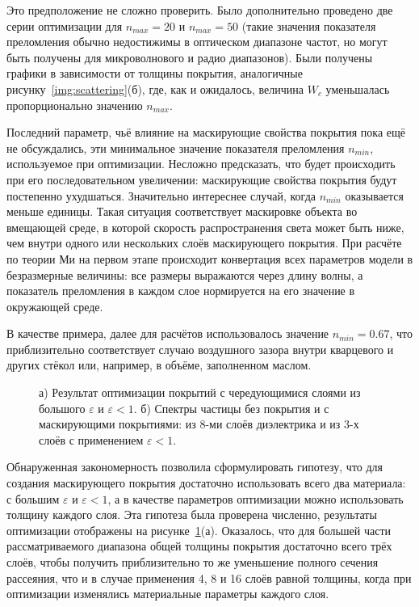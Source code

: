 Это предположение не сложно проверить. Было дополнительно проведено
две серии оптимизации для $n_{max}=20$ и $n_{max}=50$ (такие значения
показателя преломления обычно недостижимы в оптическом диапазоне
частот, но могут быть получены для микроволнового и радио диапазонов).
Были получены графики в зависимости от толщины покрытия, аналогичные
рисунку~\ref{img:scattering}(б), где, как и ожидалось, величина $W_c$
уменьшалась пропорционально значению $n_{max}$.

Последний параметр, чьё влияние на маскирующие свойства покрытия пока
ещё не обсуждались, эти минимальное значение показателя преломления
$n_{min}$, используемое при оптимизации.  Несложно предсказать, что
будет происходить при его последовательном увеличении: маскирующие
свойства покрытия будут постепенно ухудшаться.  Значительно интереснее
случай, когда $n_{min}$ оказывается меньше единицы.  Такая ситуация
соответствует маскировке объекта во вмещающей среде, в которой скорость
распространения света может быть ниже, чем внутри одного или
нескольких слоёв маскирующего покрытия.  При расчёте по теории Ми на
первом этапе происходит конвертация всех параметров модели в
безразмерные величины: все размеры выражаются через длину волны, а
показатель преломления в каждом слое нормируется на его значение в
окружающей среде.

В качестве примера, далее для расчётов использовалось значение
$n_{min}=0.67$, что приблизительно соответствует случаю воздушного
зазора внутри кварцевого и других стёкол или, например, в объёме,
заполненном маслом. 

\begin{figure}[t]
  \begin{minipage}[ht]{0.49\linewidth}
  \end{minipage}
  \hfill
  \begin{minipage}[ht]{0.49\linewidth}
  \end{minipage}
  \caption{а) Результат оптимизации покрытий с чередующимися слоями из
    большого $\varepsilon$ и ${\varepsilon<1}$. б) Спектры частицы
  без покрытия и с маскирующими покрытиями: из 8-ми слоёв диэлектрика и
  из 3-х слоёв с применением ${\varepsilon<1}$.}
  \label{img:min-max-min}  
\end{figure}

Обнаруженная закономерность позволила сформулировать гипотезу,
что для создания маскирующего покрытия достаточно использовать всего
два материала: с большим $\varepsilon$ и ${\varepsilon<1}$, а в
качестве параметров оптимизации можно использовать толщину каждого
слоя. Эта гипотеза была проверена численно, результаты оптимизации
отображены на рисунке~\ref{img:min-max-min}(а). Оказалось, что для
большей части рассматриваемого диапазона общей толщины покрытия 
достаточно всего трёх слоёв, чтобы получить приблизительно то же
уменьшение полного сечения рассеяния, что и в случае применения 4, 8 и
16 слоёв равной толщины, когда при оптимизации
изменялись материальные параметры каждого слоя.

